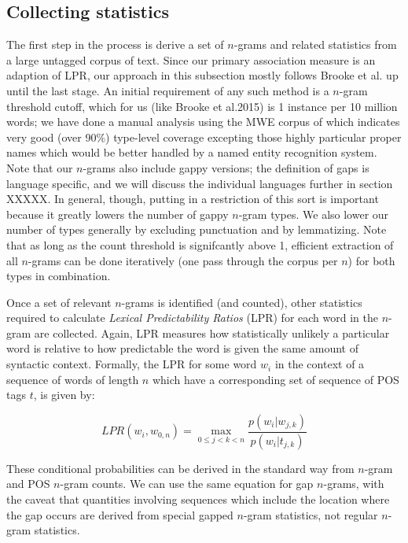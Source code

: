 \documentclass[11pt]{article}
\makeatletter
\def \al {al.\@ }
\makeatother
\begin{document}
\subsection{Collecting statistics}

The first step in the process is derive a set of $n$-grams and related statistics from a large untagged corpus of text. Since our primary association measure is an adaption of LPR, our approach in this subsection mostly follows Brooke et \al {} up until the last stage. An initial requirement of any such method is a $n$-gram threshold cutoff, which for us (like Brooke et \al 2015) is 1 instance per 10 million words; we have done a manual analysis using the MWE corpus of \cite{Schneider14a} which indicates very good (over 90\%) type-level coverage excepting those highly particular proper names which would be better handled by a named entity recognition system. Note that our $n$-grams also include gappy versions; the definition of gaps is language specific, and we will discuss the individual languages further in section XXXXX. In general, though, putting in a restriction of this sort is important because it greatly lowers the number of gappy $n$-gram types. We also lower our number of types generally by excluding punctuation and by lemmatizing.  Note that as long as the count threshold is signifcantly above 1, efficient extraction of all $n$-grams can be done iteratively (one pass through the corpus per $n$) for both types in combination. 

Once a set of relevant $n$-grams is identified (and counted), other statistics required to calculate \emph{Lexical Predictability Ratios} (LPR) for each word in the $n$-gram are collected. Again, LPR measures how statistically unlikely a particular word is relative to how predictable the word is given the same amount of syntactic context. Formally, the LPR for some word $w_i$ in the context of a sequence of words of length $n$ which have a corresponding set of sequence of POS tags $t$, is given by:

\begin{displaymath}
LPR(w_i,w_{0,n}) = \max_{0 \leq j < k < n }{\frac{p(w_i|w_{j,k})}{p(w_i|t_{j,k})}}
\end{displaymath}

These conditional probabilities can be derived in the standard way from $n$-gram and POS $n$-gram counts. We can use the same equation for gap $n$-grams, with the caveat that quantities involving sequences which include the location where the gap occurs are derived from special gapped $n$-gram statistics, not regular $n$-gram statistics.  
\end{document}

